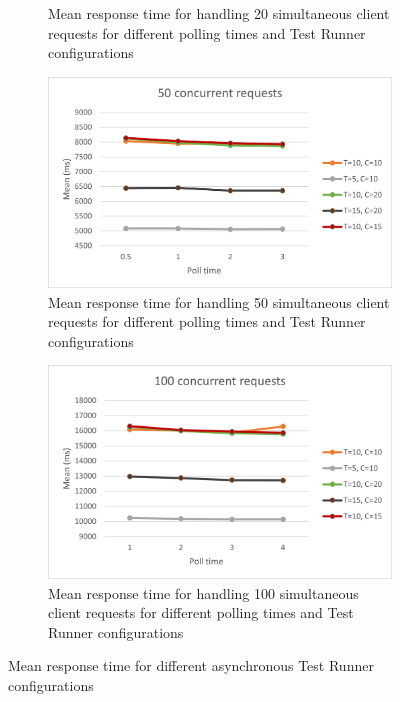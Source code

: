 \begin{figure}
\begin{subfigure}[b]{0.45\textwidth}
    \caption{Mean response time for handling 20 simultaneous client requests for different polling times and Test Runner configurations}
  \end{subfigure}
  \hfill
  \begin{subfigure}[b]{0.45\textwidth}
    \centering
    \includegraphics[width=\textwidth]{images/50.png}
    \caption{Mean response time for handling 50 simultaneous client requests for different polling times and Test Runner configurations}
  \end{subfigure}
  \hfill
  \begin{subfigure}[b]{0.45\textwidth}
    \centering
    \includegraphics[width=\textwidth]{images/100.png}
    \caption{Mean response time for handling 100 simultaneous client requests for different polling times and Test Runner configurations}
    \label{fig:resultEnd}
  \end{subfigure}
\caption{Mean response time for different asynchronous Test Runner configurations}
\label{fig:configResults}
\end{figure}

